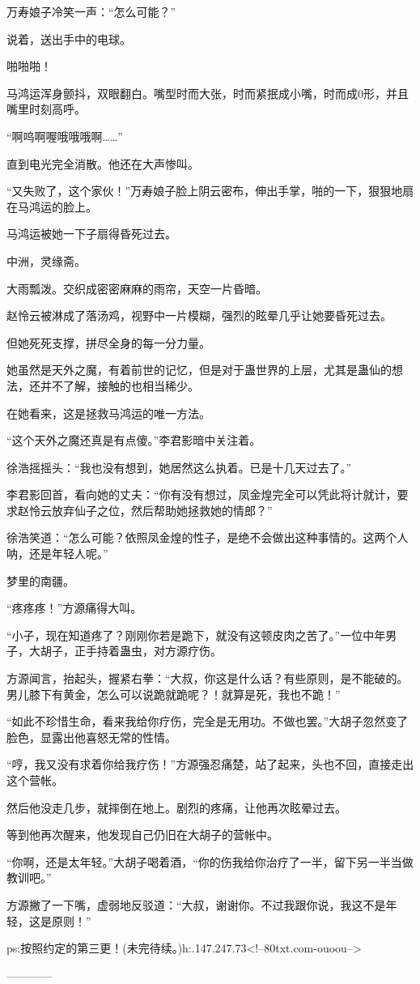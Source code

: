 \begin{this_body}
万寿娘子冷笑一声：“怎么可能？”

说着，送出手中的电球。

啪啪啪！

马鸿运浑身颤抖，双眼翻白。嘴型时而大张，时而紧抿成小嘴，时而成0形，并且嘴里时刻高呼。

“啊呜啊喔哦哦哦啊……”

直到电光完全消散。他还在大声惨叫。

“又失败了，这个家伙！”万寿娘子脸上阴云密布，伸出手掌，啪的一下，狠狠地扇在马鸿运的脸上。

马鸿运被她一下子扇得昏死过去。

中洲，灵缘斋。

大雨瓢泼。交织成密密麻麻的雨帘，天空一片昏暗。

赵怜云被淋成了落汤鸡，视野中一片模糊，强烈的眩晕几乎让她要昏死过去。

但她死死支撑，拼尽全身的每一分力量。

她虽然是天外之魔，有着前世的记忆，但是对于蛊世界的上层，尤其是蛊仙的想法，还并不了解，接触的也相当稀少。

在她看来，这是拯救马鸿运的唯一方法。

“这个天外之魔还真是有点傻。”李君影暗中关注着。

徐浩摇摇头：“我也没有想到，她居然这么执着。已是十几天过去了。”

李君影回首，看向她的丈夫：“你有没有想过，凤金煌完全可以凭此将计就计，要求赵怜云放弃仙子之位，然后帮助她拯救她的情郎？”

徐浩笑道：“怎么可能？依照凤金煌的性子，是绝不会做出这种事情的。这两个人呐，还是年轻人呢。”

梦里的南疆。

“疼疼疼！”方源痛得大叫。

“小子，现在知道疼了？刚刚你若是跪下，就没有这顿皮肉之苦了。”一位中年男子，大胡子，正手持着蛊虫，对方源疗伤。

方源闻言，抬起头，握紧右拳：“大叔，你这是什么话？有些原则，是不能破的。男儿膝下有黄金，怎么可以说跪就跪呢？！就算是死，我也不跪！”

“如此不珍惜生命，看来我给你疗伤，完全是无用功。不做也罢。”大胡子忽然变了脸色，显露出他喜怒无常的性情。

“哼，我又没有求着你给我疗伤！”方源强忍痛楚，站了起来，头也不回，直接走出这个营帐。

然后他没走几步，就摔倒在地上。剧烈的疼痛，让他再次眩晕过去。

等到他再次醒来，他发现自己仍旧在大胡子的营帐中。

“你啊，还是太年轻。”大胡子喝着酒，“你的伤我给你治疗了一半，留下另一半当做教训吧。”

方源撇了一下嘴，虚弱地反驳道：“大叔，谢谢你。不过我跟你说，我这不是年轻，这是原则！”

ps:按照约定的第三更！(未完待续。)h:.147.247.73<!--80txt.com-ouoou-->

------------

\end{this_body}


